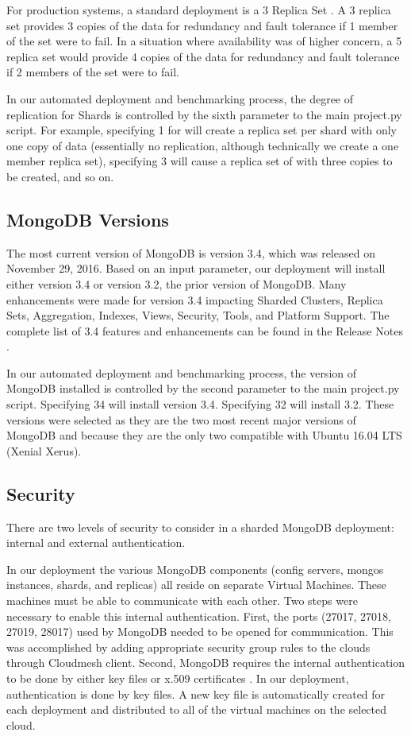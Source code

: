 \documentclass[9pt,twocolumn,twoside]{../../styles/osajnl}
\begin{document}
For production systems, a standard deployment is a 3 Replica Set
\cite{www-mongoRepDep}. A 3 replica set provides 3 copies of the data
for redundancy and fault tolerance if 1 member of the set were to
fail. In a situation where availability was of higher concern, a 5
replica set would provide 4 copies of the data for redundancy and
fault tolerance if 2 members of the set were to fail.

In our automated deployment and benchmarking process, the degree of
replication for Shards is controlled by the sixth parameter to the
main project.py script. For example, specifying 1 for will create a
replica set per shard with only one copy of data (essentially no
replication, although technically we create a one member replica set),
specifying 3 will cause a replica set of with three copies to be
created, and so on.

\subsection{MongoDB Versions}

The most current version of MongoDB is version 3.4, which was released
on November 29, 2016. Based on an input parameter, our deployment will
install either version 3.4 or version 3.2, the prior version of
MongoDB. Many enhancements were made for version 3.4 impacting Sharded
Clusters, Replica Sets, Aggregation, Indexes, Views, Security, Tools,
and Platform Support. The complete list of 3.4 features and
enhancements can be found in the Release Notes
\cite{www-mongoRelease}.

In our automated deployment and benchmarking process, the version of
MongoDB installed is controlled by the second parameter to the main
project.py script. Specifying 34 will install version 3.4. Specifying
32 will install 3.2. These versions were selected as they are the two
most recent major versions of MongoDB and because they are the only
two compatible with Ubuntu 16.04 LTS (Xenial Xerus).

\subsection{Security}

There are two levels of security to consider in a sharded MongoDB
deployment: internal and external authentication.

In our deployment the various MongoDB components (config servers,
mongos instances, shards, and replicas) all reside on separate Virtual
Machines. These machines must be able to communicate with each other.
Two steps were necessary to enable this internal authentication.
First, the ports (27017, 27018, 27019, 28017) used by MongoDB needed
to be opened for communication. This was accomplished by adding
appropriate security group rules to the clouds through Cloudmesh
client. Second, MongoDB requires the internal authentication to be
done by either key files or x.509 certificates \cite{www-mongoAuth}.
In our deployment, authentication is done by key files. A new key file
is automatically created for each deployment and distributed to all of
the virtual machines on the selected cloud.
\end{document}
